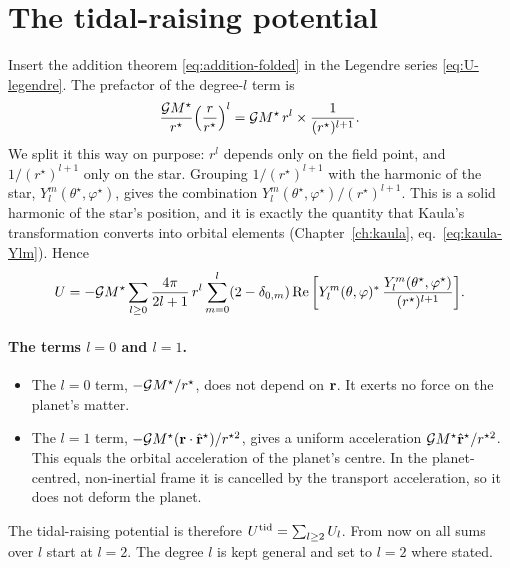 \section{The tidal-raising potential}
Insert the addition theorem \eqref{eq:addition-folded} in the Legendre series \eqref{eq:U-legendre}. The prefactor of the degree-$l$ term is
\[
  \frac{\mathcal{G} M^\star}{r^\star}\Big(\frac{r}{r^\star}\Big)^l=\mathcal{G} M^\star\,r^l\times\frac{1}{(r^\star)^{l+1}}.
\]
We split it this way on purpose: $r^l$ depends only on the field point, and $1/(r^\star)^{l+1}$ only on the star. Grouping $1/(r^\star)^{l+1}$ with the harmonic of the star, $Y_l^m(\theta^\star,\varphi^\star)$, gives the combination $Y_l^m(\theta^\star,\varphi^\star)/(r^\star)^{l+1}$. This is a solid harmonic of the star's position, and it is exactly the quantity that Kaula's transformation converts into orbital elements (Chapter~\ref{ch:kaula}, eq.~\eqref{eq:kaula-Ylm}). Hence
\begin{equation}
  U=-\mathcal{G} M^\star\sum_{l\ge0}\frac{4\pi}{2l+1}\,r^l\sum_{m=0}^{l}(2-\delta_{0,m})\operatorname{Re}\bigg[Y_l^m(\theta,\varphi)^*\,\frac{Y_l^m(\theta^\star,\varphi^\star)}{(r^\star)^{l+1}}\bigg]. \label{eq:U-harmonics}
\end{equation}

\paragraph{The terms $l=0$ and $l=1$.}
\begin{itemize}
  \item The $l=0$ term, $-\mathcal{G} M^\star/r^\star$, does not depend on $\mathbf r$. It exerts no force on the planet's matter.
  \item The $l=1$ term, $-\mathcal{G} M^\star(\mathbf r\cdot\hat{\mathbf r}^\star)/r^{\star2}$, gives a uniform acceleration $\mathcal{G} M^\star\hat{\mathbf r}^\star/r^{\star2}$. This equals the orbital acceleration of the planet's centre. In the planet-centred, non-inertial frame it is cancelled by the transport acceleration, so it does not deform the planet.
\end{itemize}
The tidal-raising potential is therefore $U^{\rm tid}=\sum_{l\ge2}U_l$. From now on all sums over $l$ start at $l=2$. The degree $l$ is kept general and set to $l=2$ where stated.
